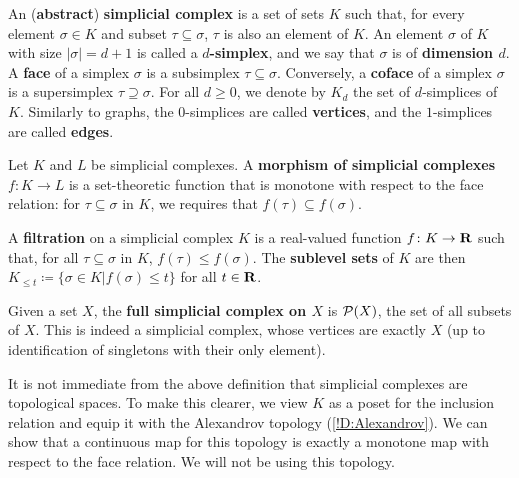 \begin{definition}
\label{D:simplicial-complex}
  An (\textbf{abstract}) \textbf{simplicial complex} is a set of sets $K$ such that, for every element $\sigma \in K$ and subset $\tau \subseteq \sigma$, $\tau$ is also an element of $K$. An element $\sigma$ of $K$ with size $|\sigma| = d + 1$ is called a \textbf{$d$-simplex}, and we say that $\sigma$ is of \textbf{dimension $d$}. A \textbf{face} of a simplex $\sigma$ is a subsimplex $\tau \subseteq \sigma$. Conversely, a \textbf{coface} of a simplex $\sigma$ is a supersimplex $\tau \supseteq \sigma$.
  For all $d \geq 0$, we denote by $K_d$ the set of $d$-simplices of $K$. Similarly to graphs, the $0$-simplices are called \textbf{vertices}, and the $1$-simplices are called \textbf{edges}.
  
  Let $K$ and $L$ be simplicial complexes. A \textbf{morphism of simplicial complexes} $f \colon K \to L$ is a set-theoretic function that is monotone with respect to the face relation: for $\tau \subseteq \sigma$ in $K$, we requires that $f(\tau) \subseteq f(\sigma)$.
  
  A \textbf{filtration} on a simplicial complex $K$ is a real-valued function $f \colon K \to \mathbf{R}$ such that, for all $\tau \subseteq \sigma$ in $K$, $f(\tau) \leq f(\sigma)$. The \textbf{sublevel sets} of $K$ are then $K_{\leq t} \coloneq \{\sigma \in K | f(\sigma) \leq t\}$ for all $t \in \mathbf{R}$.
\end{definition}

\begin{example}
  Given a set $X$, the \textbf{full simplicial complex on $X$} is $\mathcal{P}(X)$, the set of all subsets of $X$. This is indeed a simplicial complex, whose vertices are exactly $X$ (up to identification of singletons with their only element).
\end{example}

\begin{remark}
  It is not immediate from the above definition that simplicial complexes are topological spaces. To make this clearer, we view $K$ as a poset for the inclusion relation and equip it with the Alexandrov topology (\cref{!D:Alexandrov}). We can show that a continuous map for this topology is exactly a monotone map with respect to the face relation. We will not be using this topology.
\end{remark}

